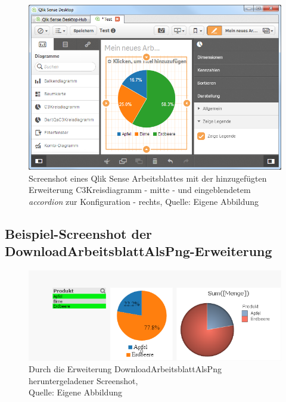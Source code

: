\begin{appendix}
\ifIncludeFigures\begin{figure}[htbp]
	\centering
		\includegraphics[width=1.00\textwidth]{img/SenseScreenshots/ArbeitsblattQlikSense.PNG}
	\caption[Screenshot des C3Kreisdiagramms in einem Qlik Sense Arbeitsblatt]{Screenshot eines Qlik Sense Arbeitsblattes mit der hinzugefügten Erweiterung C3Kreisdiagramm - mitte - und eingeblendetem \textit{accordion} zur Konfiguration - rechts, Quelle: Eigene Abbildung}
	\label{fig:ArbeitsblattQlikSense}
\end{figure}\fi


\newpage
\subsection{Beispiel-Screenshot der DownloadArbeitsblattAlsPng-Erweiterung} 
\label{lab:BeispielScreenshotDownloadArbeitsblattAlsPng} 



\ifIncludeFigures\begin{figure}[htbp]
	\centering
		\includegraphics[width=1.00\textwidth]{img/ScreenshotSheet/ScreenshotSheet.png}
	\caption[Durch die Erweiterung DownloadArbeitsblattAlsPng heruntergeladener Screenshot]{Durch die Erweiterung DownloadArbeitsblattAlsPng heruntergeladener Screenshot, \\Quelle: Eigene Abbildung}
	\label{fig:ScreenshotSheet}
\end{figure}\fi



\end{appendix}
